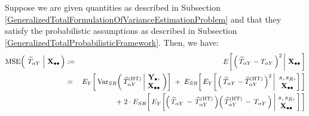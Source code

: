 \vskip 0.1cm
\begin{lemma}
\label{DecompositionMSETtilde}
\mbox{}
\vskip 0.1cm
\noindent
Suppose we are given quantities as described in Subsection
\ref{GeneralizedTotalFormulationOfVarianceEstimationProblem}
and
that they satisfy the probabilistic assumptions as described in Subsection
\ref{GeneralizedTotalProbabilisticFramework}.
\vskip 0.1cm
\noindent
Then, we have:
\begin{eqnarray*}
\MSE\!\left(\;
    \left.
    \widetilde{T}_{\alpha Y}
    \;\right\vert\,
    \Xobs
    \,\right)
& := &
    E\!\left[
        \left.
        \left(\,\widetilde{T}_{\alpha Y} - T_{\alpha Y}\,\right)^{2}
        \,\right\vert\,
        \Xobs
        \,\right]
\\
& = &
    E_{Y}\!\left[\,
    \Var_{SR}\!\left(\,
        \widehat{T}^{\textnormal{(HT)}}_{\alpha Y}
        \left\vert\!
        \begin{array}{c} \Ydot, \\ \Xobs \end{array}
        \right.
        \!\!\right)
        \right]
    \;+\;
    E_{SR}\!\left[\,
    E_{Y}\!\left[
        \left.
        \left(\,\widetilde{T}_{\alpha Y} - \widehat{T}^{\textnormal{(HT)}}_{\alpha Y}\,\right)^{2}
        \,\right\vert\!
        \begin{array}{c} s,s_{R}, \\ \Xobs \end{array}
        \!\!\right]
        \,\right]
\\
&&
    +\;2\cdot
    E_{SR}\!\left[\,
    E_{Y}\!\left[
        \left(\,\widetilde{T}_{\alpha Y} \,-\, \widehat{T}^{\textnormal{(HT)}}_{\alpha Y}\,\right)
        \!
        \left(\,\widehat{T}^{\textnormal{(HT)}}_{\alpha Y} \,-\, T_{\alpha Y}\,\right)
        \left\vert\!
        \begin{array}{c} s,s_{R}, \\ \Xobs \end{array}
        \right.
        \!\!\right]
        \,\right]
\end{eqnarray*}
\end{lemma}
\proof
